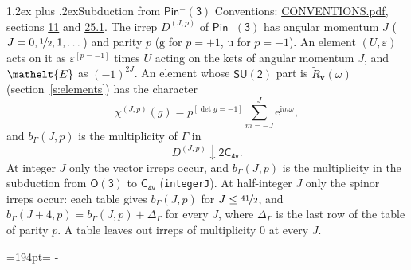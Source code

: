 \documentclass[10pt,a4paper]{article}
\makeatletter
\renewcommand\section{\@startsection{section}{1}{\z@}{-3ex plus -1ex minus -.2ex}%
  {1.2ex plus .2ex}{\normalfont\large\sffamily\bfseries\color{parttitle}}}
\newcommand{\needspace}[1]{\par\penalty-100\begingroup\dimen0=#1\relax\dimen2=\pagegoal
  \advance\dimen2-\pagetotal\ifdim\dimen0>\dimen2\relax\ifdim\dimen2>0pt\vfil\break\fi\fi
  \endgroup}
\numberwithin{equation}{section}
\newcommand{\eltfont}[1]{{\let\sigma\eltsigma\mathelt{#1}}}
\newcommand{\grp}[1]{\mathsf{#1}}
\newcommand{\elt}[1]{\eltfont{#1}}
\newcommand{\ptag}[1]{\mathrm{#1}}
\newcommand{\iverson}[1]{[#1]}
\newcommand{\restr}[2]{#1\!\downarrow#2}
\newcommand{\vv}{\mathbf{v}}
\newcommand{\iunit}{\mathrm{i}}
\newcommand{\expe}{\mathrm{e}}
\newcommand{\irrJp}[2]{D^{(#1,#2)}}
\newcommand{\barred}[1]{\bar{#1}}
\newcommand{\lift}[1]{\tilde{#1}}
\makeatother
\begin{document}
\section{Subduction from \texorpdfstring{$\grp{Pin^{-}(3)}$}{Pin(3)}}\label{s:subduction_parent}
Conventions: \href{../../CONVENTIONS.pdf}{CONVENTIONS.pdf}, sections \href{../../../rotation/CONVENTIONS.pdf\#conv.11}{11} and \href{../../CONVENTIONS.pdf\#conv.25.1}{25.1}.
\leavevmode\label{n:index.J}\label{n:index.parity}\label{n:irrep.o3}The irrep $\irrJp{J}{p}$ of \href{Pinminus3.pdf}{$\grp{Pin^{-}(3)}$} has angular momentum $J$ ($J = 0, \nicefrac{1}{2}, 1, \dots$) and parity $p$ ($\ptag{g}$ for $p = +1$, $\ptag{u}$ for $p = -1$). An element $(U, \varepsilon)$ acts on it as $\varepsilon^{[p = -1]}$ times $U$ acting on the kets of angular momentum $J$, and $\elt{\barred{E}}$ as $(-1)^{2J}$. \label{n:function.character.parent}\label{n:function.multiplicity}An element whose $\grp{SU(2)}$ part is $\lift{R}_{\vv}(\omega)$ (section~\ref{s:elements}) has the character
\begin{equation}\label{e:chi}\chi^{(J,p)}(g) = p^{\iverson{\det g = -1}}\sum_{m=-J}^{J} \expe^{\iunit m\omega},\end{equation}
and $b_\Gamma(J, p)$ is the multiplicity of $\Gamma$ in
\begin{equation}\label{e:parent}\restr{\irrJp{J}{p}}{\grp{2C_{4v}}}.\end{equation}
At integer $J$ only the vector irreps occur, and $b_\Gamma(J, p)$ is the multiplicity in the subduction from $\grp{O(3)}$ to \href{../../../rotation/data/pdf/C4v.pdf}{$\grp{C_{4v}}$} (\texttt{integerJ}). \label{n:index.increment}At half-integer $J$ only the spinor irreps occur: each table gives $b_\Gamma(J, p)$ for $J \le \nicefrac{41}{2}$, and $b_\Gamma(J + 4, p) = b_\Gamma(J, p) + \Delta_\Gamma$ for every $J$, where $\Delta_\Gamma$ is the last row of the table of parity $p$. A table leaves out irreps of multiplicity 0 at every $J$.
\needspace{194pt}
\end{document}
